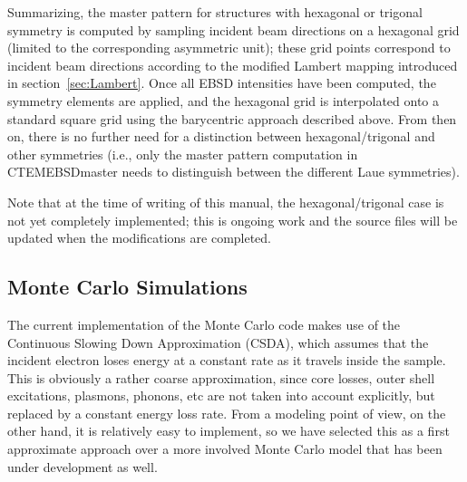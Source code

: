 \documentclass[DIV=calc, paper=letter, fontsize=11pt]{scrartcl}	 %
\begin{document}
Summarizing, the master pattern for structures with hexagonal or trigonal symmetry is computed by sampling incident beam directions
on a hexagonal grid (limited to the corresponding asymmetric unit); these grid points correspond to incident beam directions according 
to the modified Lambert mapping introduced in section~\ref{sec:Lambert}.  Once all EBSD intensities have been computed, the symmetry
elements are applied, and the hexagonal grid is interpolated onto a standard square grid using the barycentric approach described above.
From then on, there is no further need for a distinction between hexagonal/trigonal and other symmetries (i.e., only the master pattern
computation in \textsf{CTEMEBSDmaster} needs to distinguish between the different Laue symmetries).

{\color{blue}Note that at the time of writing of this manual, the hexagonal/trigonal case is not yet completely implemented; this is ongoing work
and the source files will be updated when the modifications are completed.}

\newpage
\subsection{Monte Carlo Simulations \label{sec:MC}}
The current implementation of the Monte Carlo code makes use of the Continuous Slowing Down Approximation (CSDA),
which assumes that the incident electron loses energy at a constant rate as it travels inside the sample.  This is obviously a
rather coarse approximation, since core losses, outer shell excitations, plasmons, phonons, etc are not taken into account
explicitly, but replaced by a constant energy loss rate.  From a modeling point of view, on the other hand, it is relatively easy
to implement, so we have selected this as a first approximate approach over a more involved Monte Carlo model that has been
under development as well.  
\end{document}
